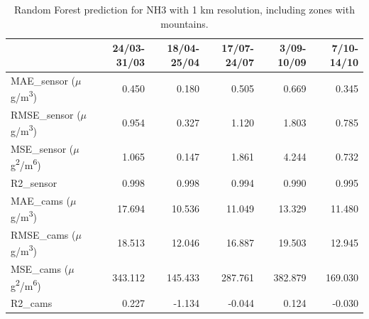 \begin{table}[H]
\begin{tabular}{lrrrrr}
\toprule
 &  24/03-31/03 &  18/04-25/04 &  17/07-24/07 &  3/09-10/09 &  7/10-14/10 \\
\midrule
 MAE\_sensor ($\mu$g/m\textsuperscript{3})&        0.450 &        0.180 &        0.505 &       0.669 &       0.345 \\
RMSE\_sensor ($\mu$g/m\textsuperscript{3})&        0.954 &        0.327 &        1.120 &       1.803 &       0.785 \\
 MSE\_sensor ($\mu$g\textsuperscript{2}/m\textsuperscript{6})&        1.065 &        0.147 &        1.861 &       4.244 &       0.732 \\
  R2\_sensor &        0.998 &        0.998 &        0.994 &       0.990 &       0.995 \\
   MAE\_cams ($\mu$g/m\textsuperscript{3})&       17.694 &       10.536 &       11.049 &      13.329 &      11.480 \\
  RMSE\_cams ($\mu$g/m\textsuperscript{3})&       18.513 &       12.046 &       16.887 &      19.503 &      12.945 \\
   MSE\_cams ($\mu$g\textsuperscript{2}/m\textsuperscript{6})&      343.112 &      145.433 &      287.761 &     382.879 &     169.030 \\
    R2\_cams &        0.227 &       -1.134 &       -0.044 &       0.124 &      -0.030 \\
\bottomrule
\end{tabular}
\caption{Random Forest prediction for NH3 with 1 km resolution, including zones with mountains.}
\end{table}
